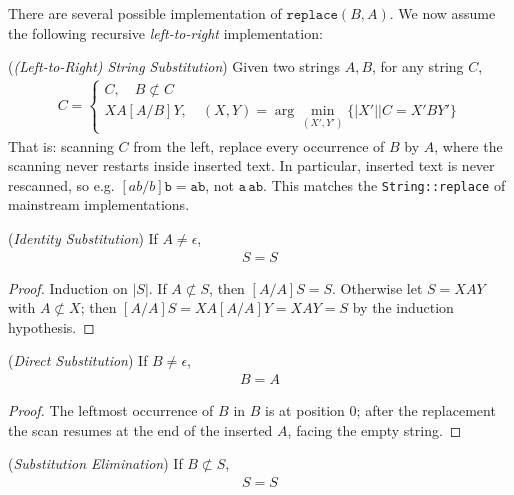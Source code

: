 \documentclass[runningheads,envcountsect]{llncs}
\begin{document}
There are several possible implementation of $\mathtt{replace}(B, A)$. We now assume the following recursive \textit{left-to-right} implementation:

\begin{definition}
    (\emph{(Left-to-Right) String Substitution})
    \label{def:subst}
    Given two strings $A, B$, for any string $C$,
    \begin{align}
        [A/B]C = \begin{cases}
            C,\quad B \not\subset C\\
            XA[A/B]Y,\quad (X, Y) = \arg\min_{(X', Y')} \{ |X'| | C = X'BY' \}
        \end{cases}
    \end{align}
    That is: scanning $C$ from the left, replace every occurrence of $B$ by $A$, where the scanning never restarts inside inserted text. In particular, inserted text is never rescanned, so e.g. $[ab/b]\mathtt{b} = \mathtt{ab}$, not $\mathtt{a}\,\mathtt{ab}$. This matches the \texttt{String::replace} of mainstream implementations.
\end{definition}

\begin{theorem}
    (\emph{Identity Substitution})
    If $A\neq \epsilon$,
    \begin{align}
        [A/A]S = S
    \end{align}
\end{theorem}

\begin{proof}
    Induction on $|S|$. If $A \not\subset S$, then $[A/A]S=S$. Otherwise let $S = XAY$ with $A \not\subset X$; then $[A/A]S = XA[A/A]Y = XAY = S$ by the induction hypothesis.
\end{proof}

\begin{theorem}
    (\emph{Direct Substitution})
    If $B\neq \epsilon$,
    \begin{align}
        [A/B]B = A
    \end{align}
\end{theorem}

\begin{proof}
    The leftmost occurrence of $B$ in $B$ is at position $0$; after the replacement the scan resumes at the end of the inserted $A$, facing the empty string.
\end{proof}

\begin{theorem}
    (\emph{Substitution Elimination})
    If $B\not\subset S$,
    \begin{align}
        [A/B]S = S
    \end{align}
\end{theorem}
\end{document}
